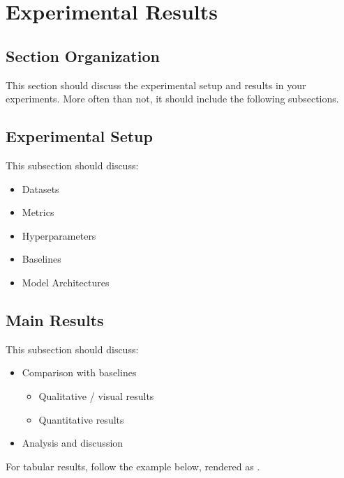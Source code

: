\section{Experimental Results}\label{sec:results}

\subsection{Section Organization}\label{sec:results:organization}

This section should discuss
the experimental setup and results
in your experiments.
More often than not,
it should include the following subsections.

\subsection{Experimental Setup}\label{sec:results:setup}

This subsection should discuss:
\begin{itemize}
    \item Datasets
    \item Metrics
    \item Hyperparameters
    \item Baselines
    \item Model Architectures
\end{itemize}

\subsection{Main Results}\label{sec:results:main}

This subsection should discuss:
\begin{itemize}
    \item Comparison with baselines
    \begin{itemize}
        \item Qualitative / visual results
        \item Quantitative results
    \end{itemize}
    \item Analysis and discussion
\end{itemize}

For tabular results,
follow the example below,
rendered as .

